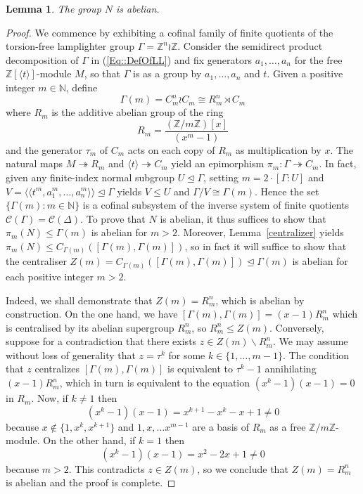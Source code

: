 \documentclass[10pt,a4paper]{amsart}
\newtheorem{lemma}{Lemma}
\newcommand{\Z}{\mathbb{Z}}
\begin{document}
\begin{lemma}\label{Lem::Abelian} The group $N$ is abelian.
\end{lemma}

\begin{proof} We commence by exhibiting a cofinal family of finite quotients of the torsion-free lamplighter group $\Gamma = \Z^n \wr \Z$. Consider the semidirect product decomposition of $\Gamma$ in (\ref{Eq::DefOfLL}) and fix generators $a_1, \ldots, a_n$ for the free $\Z[\langle t \rangle]$-module $M$, so that $\Gamma$ is as a group by $a_1, \ldots, a_n$ and $t$. Given a positive integer $m \in \mathbb{N}$, define
\[
\Gamma(m) = C_m^n \wr C_m \cong R_m^n \rtimes C_m
\] where $R_m$ is the additive abelian group of the ring
\[
R_m = \frac{(\Z/m\Z)[x]}{(x^m - 1)}
\]
and the generator $\tau_m$ of $C_m$ acts on each copy of $R_m$ as multiplication by $x$. The natural maps $M \twoheadrightarrow R_m$ and $\langle t \rangle \twoheadrightarrow C_m$ yield an epimorphism $\pi_m \colon \Gamma \twoheadrightarrow C_m$. In fact, given any finite-index normal subgroup $U \trianglelefteq \Gamma$, setting $m = 2\cdot [\Gamma : U]$ and $V = \langle \langle t^m,a_1^m,\ldots, a_n^m\rangle \rangle \trianglelefteq \Gamma$ yields $V \leq U$ and $\Gamma / V \cong \Gamma(m)$. Hence the set $\{\Gamma(m) : m \in \mathbb{N}\}$ is a cofinal subsystem of the inverse system of finite quotients $\mathcal{C}(\Gamma) = \mathcal{C}(\Delta)$. To prove that $N$ is abelian, it thus suffices to show that $\pi_m(N) \leq \Gamma(m)$ is abelian for $m > 2$.
Moreover, Lemma~\ref{centralizer} yields $\pi_m(N) \leq C_{\Gamma(m)}([\Gamma(m), \Gamma(m)])$, so in fact it will suffice to show that the centraliser $Z(m) = C_{\Gamma(m)}([\Gamma(m), \Gamma(m)]) \trianglelefteq \Gamma(m)$ is abelian for each positive integer $m > 2$.

Indeed, we shall demonstrate that $Z(m) = R_m^n$, which is abelian by construction. On the one hand, we have $[\Gamma(m), \Gamma(m)] = (x-1) R_m^n$ which is centralised by its abelian supergroup $R_m^n$, so $R_m^n \leq Z(m)$. Conversely, suppose for a contradiction that there exists $z \in Z(m) \backslash R_m^n$. We may assume without loss of generality that $z=\tau^k$ for some $k \in \{1, \ldots, m-1\}$. The condition that $z$ centralizes $[\Gamma(m),\Gamma(m)]$ is equivalent to $\tau^k-1$ annihilating $(x-1)R_m^n$, which in turn is equivalent to the equation $(x^k-1)(x-1)=0$ in $R_m$. Now, if $k \neq 1$ then
\[
(x^k-1)(x-1)=x^{k+1}-x^k-x+1 \neq 0
\] because $x \not \in \{1,x^k,x^{k+1}\}$ and $1,x, \ldots x^{m-1}$ are a basis of $R_m$ as a free $\Z/m\Z$-module. On the other hand, if $k = 1$ then \[
(x^k-1)(x-1)=x^2 -2x+1 \not =0
\]
because $m>2$. This contradicts $z \in Z(m)$, so we conclude that $Z(m) = R_m^n$ is abelian and the proof is complete.
\end{proof}
\end{document}
